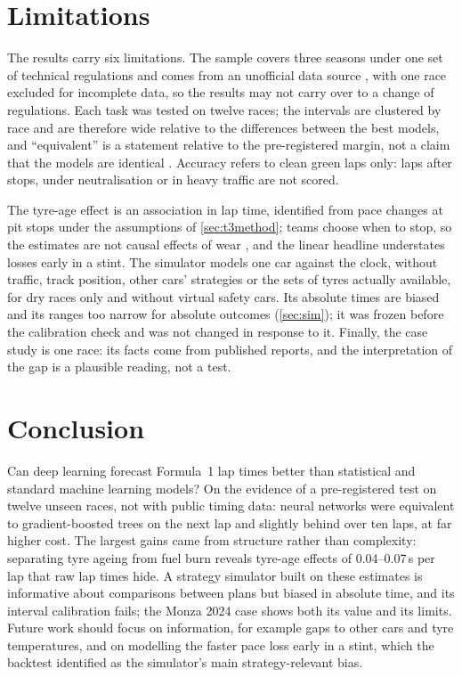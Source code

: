\documentclass[12pt]{article}
\begin{document}
\section{Limitations}\label{sec:limits}

The results carry six limitations. The sample covers three seasons under one set of technical regulations and comes
from an unofficial data source \parencite{openf1}, with one race excluded for incomplete data, so the results may not
carry over to a change of regulations. Each task was tested on twelve races; the intervals are clustered by race and are
therefore wide relative to the differences between the best models, and ``equivalent'' is a statement relative to the
pre-registered margin, not a claim that the models are identical \parencite{lakens2017}. Accuracy refers to clean green
laps only: laps after stops, under neutralisation or in heavy traffic are not scored.

The tyre-age effect is an association in lap time, identified from pace changes at pit stops under the assumptions of
\cref{sec:t3method}; teams choose when to stop, so the estimates are not causal effects of wear
\parencite{angrist2009,fosse2019}, and the linear headline understates losses early in a stint. The simulator models one
car against the clock, without traffic, track position, other cars' strategies or the sets of tyres actually available,
for dry races only and without virtual safety cars. Its absolute times are biased and its ranges too narrow for absolute
outcomes (\cref{sec:sim}); it was frozen before the calibration check and was not changed in response to it. Finally,
the case study is one race: its facts come from published reports, and the interpretation of the gap is a plausible
reading, not a test.

\section{Conclusion}\label{sec:conclusion}

Can deep learning forecast Formula~1 lap times better than statistical and standard machine learning models? On the
evidence of a pre-registered test on twelve unseen races, not with public timing data: neural networks were equivalent
to gradient-boosted trees on the next lap and slightly behind over ten laps, at far higher cost. The largest gains came
from structure rather than complexity: separating tyre ageing from fuel burn reveals tyre-age effects of 0.04--0.07\,s
per lap that raw lap times hide. A strategy simulator built on these estimates is informative about comparisons between
plans but biased in absolute time, and its interval calibration fails; the Monza 2024 case shows both its value and its
limits. Future work should focus on information, for example gaps to other cars and tyre temperatures, and on
modelling the faster pace loss early in a stint, which the backtest identified as the simulator's main strategy-relevant
bias.
\end{document}
